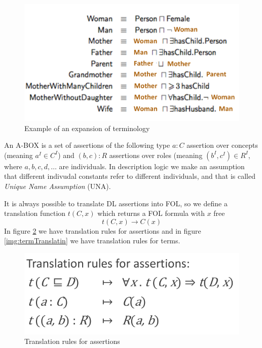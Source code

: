 \begin{figure}
	\includegraphics[width=\textwidth]{Images/expanded}
	\caption{Example of an expansion of terminology}
	\label{img:expandedTerminology}
\end{figure}
An A-BOX is a set of assertions of the following type $a: C$ assertion over concepts
(meaning $a^I \in C^I$) and $(b, c) : R$ assertions over roles (meaning $(b^I, c^I) \in R^I$,
where $a, b, c, d, \dots$ are individuals.\newline
In description logic we make an assumption that different indivudal constants refer to
different individuals, and that is called \emph{Unique Name Assumption} (UNA).

It is always possible to translate DL assertions into FOL, so we define a translation
function $t(C, x)$ which returns a FOL formula with $x$ free
\[ t(C, x) \to C(x) \]
In figure \ref{img:assertTranslation} we have translation rules for assertions and 
in figure \ref{img:termTranslatin} we have translation rules for terms.

\begin{figure}
	\includegraphics[width=\textwidth]{Images/assertTranslation}
	\caption{Translation rules for assertions}
	\label{img:assertTranslation}
\end{figure}

